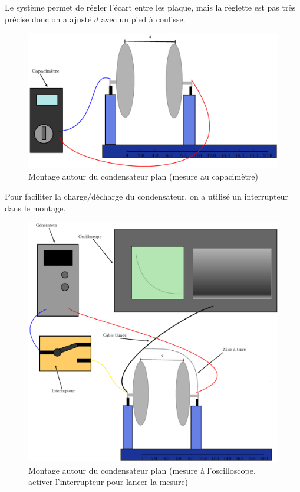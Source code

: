 \documentclass[11pt]{article}
\begin{document}
Le système permet de régler l'écart entre les plaque, mais la réglette est pas très précise donc on a ajusté $d$ avec un pied à coulisse.

\begin{figure}[H]
\centering
\includegraphics[scale=0.5]{Images/mesure1_capa.pdf}
\caption{Montage autour du condensateur plan (mesure au capacimètre)}
\label{fig:cap-schem1}
\end{figure}

Pour faciliter la charge/décharge du condensateur, on a utilisé un interrupteur dans le montage.

\begin{figure}[H]
\centering
\includegraphics[scale=0.5]{Images/mesure1_osc.pdf}
\caption{Montage autour du condensateur plan (mesure à l'oscilloscope, activer l'interrupteur pour lancer la mesure)}
\label{fig:exp-schem1}
\end{figure}
\end{document}
